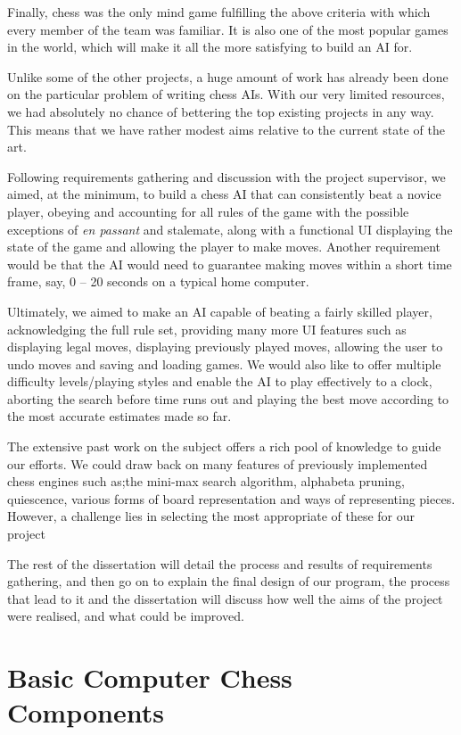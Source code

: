 \documentclass{l3proj}
\begin{document}
	Finally, chess was the only mind game fulfilling the above criteria with which every
member of the team was familiar. It is also one of the most popular games in the world,
which will make it all the more satisfying to build an AI for.

	Unlike some of the other projects, a huge amount of work has already been done on the
particular problem of writing chess AIs. With our very limited resources, we had
absolutely no chance of bettering the top existing projects in any way. This means that we have rather modest aims
relative to the current state of the art.

	Following requirements gathering and discussion with the project supervisor, we aimed, at the minimum, to build a chess AI that can consistently beat a novice player, obeying and accounting for all rules of the game with the possible exceptions of
\emph{en passant} and stalemate, along with a functional UI displaying the state of the game and
allowing the player to make moves. Another requirement would be that the AI would need to guarantee making moves within
a short time frame, say, 0 – 20 seconds on a typical home computer.

	Ultimately, we aimed to make an AI capable of beating a fairly skilled player,
acknowledging the full rule set, providing many more UI features such as displaying legal
moves, displaying previously played moves, allowing the user to undo moves and saving
and loading games. We would also like to offer multiple difficulty levels/playing styles and
enable the AI to play effectively to a clock, aborting the search before time runs out and
playing the best move according to the most accurate estimates made so far.

	The extensive past work on the subject offers a rich pool of knowledge to guide our efforts. We could draw back on many features of previously implemented chess engines such as;the mini-max search algorithm, alphabeta pruning, quiescence, various forms of board representation and ways of representing pieces. However, a challenge lies in selecting the most appropriate of these for our project

	The rest of the dissertation will detail the process and results of requirements gathering,
and then go on to explain the final design of our program, the process that lead to it and the dissertation will discuss how well the aims of the project were realised, and what could be improved.

\section{Basic Computer Chess Components} 
\end{document}
